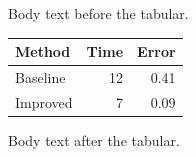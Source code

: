 \documentclass{article}
\begin{document}
Body text before the tabular.

\begin{center}
\begin{tabular}{|l|r|r|}
\hline
Method & Time & Error \\
\hline
Baseline & 12 & 0.41 \\
Improved & 7 & 0.09 \\
\hline
\end{tabular}
\end{center}

Body text after the tabular.
\end{document}
